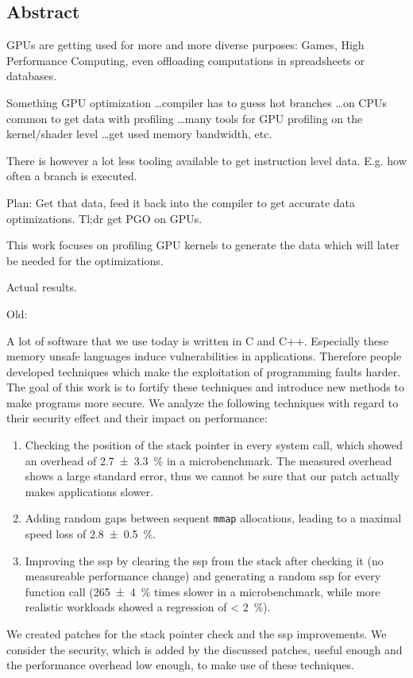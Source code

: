 \newpage
\vspace*{3.5cm}
\begin{center}
\begin{minipage}{12.5cm}
\section*{Abstract}
GPUs are getting used for more and more diverse purposes: Games, High Performance Computing, even offloading computations in spreadsheets or databases.

Something GPU optimization \dots compiler has to guess hot branches \dots on CPUs common to get data with profiling \dots many tools for GPU profiling on the kernel/shader level \dots get used memory bandwidth, etc.

There is however a lot less tooling available to get instruction level data. E.g. how often a branch is executed.

Plan: Get that data, feed it back into the compiler to get accurate data optimizations. Tl;dr get PGO on GPUs.

This work focuses on profiling GPU kernels to generate the data which will later be needed for the optimizations.

Actual results.

Old:

A lot of software that we use today is written in C and C++. Especially these memory unsafe languages induce vulnerabilities in applications. Therefore people developed techniques which make the exploitation of programming faults harder. The goal of this work is to fortify these techniques and introduce new methods to make programs more secure. We analyze the following techniques with regard to their security effect and their impact on performance:
\begin{enumerate}
	\item Checking the position of the stack pointer in every system call, which showed an overhead of \SI{2.7 \pm 3.3}{\percent} in a microbenchmark. The measured overhead shows a large standard error, thus we cannot be sure that our patch actually makes applications slower.
	\item Adding random gaps between sequent \texttt{mmap} allocations, leading to a maximal speed loss of \SI{2.8 \pm 0.5}{\percent}.
	\item Improving the \gls{ssp} by clearing the \gls{ssp} from the stack after checking it (no measureable performance change) and generating a random \gls{ssp} for every function call (\SI{265 \pm 4}{\percent} times slower in a microbenchmark, while more realistic workloads showed a regression of \SI{< 2}{\percent}).
\end{enumerate}

We created patches for the stack pointer check and the \gls{ssp} improvements. We consider the security, which is added by the discussed patches, useful enough and the performance overhead low enough, to make use of these techniques.

\end{minipage}
\end{center}

